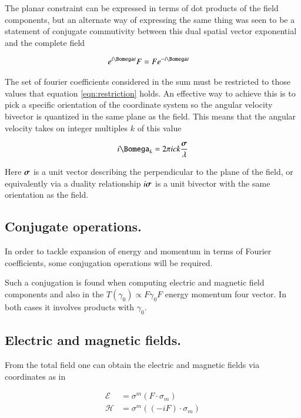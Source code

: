 \documentclass{article}
\newcommand{\EE}[0]{\boldsymbol{\mathcal{E}}}
\newcommand{\HH}[0]{\boldsymbol{\mathcal{H}}}
\begin{document}
The planar constraint can be expressed in terms of dot products of the field components, but an alternate way of expressing the same thing was seen to be
a statement of conjugate commutivity between this dual spatial vector exponential and the complete field

\begin{align}\label{eqn:restriction}
e^{ i \Bomega t} F &= F e^{ -i \Bomega t} 
\end{align}

The set of fourier coefficients considered in the sum must be restricted to those values that equation \ref{eqn:restriction} holds.  An effective 
way to achieve this is to 
pick a specific orientation of the coordinate system so the angular
velocity bivector is quantized in the same plane as the field.  This means that
the angular velocity takes on integer multiples $k$ of this value

\begin{align}
i \Bomega_k = 2 \pi i c k \frac{\Bsigma}{\lambda}
\end{align}

Here $\boldsymbol{\sigma}$ is a unit vector describing the perpendicular to the plane of the field, or equivalently via a duality relationship $i \boldsymbol{\sigma}$ is a unit bivector with the same orientation as the field.

\subsection{ Conjugate operations. }

In order to tackle expansion of energy and momentum in terms of Fourier coefficients, some conjugation operations will be required.

Such a conjugation is found when computing electric and magnetic field components and also in the $T(\gamma_0) \propto F \gamma_0 F$ energy 
momentum four vector.  In both cases it involves products with $\gamma_0$.

\subsection{ Electric and magnetic fields. }

From the total field one can 
obtain the electric and magnetic fields via coordinates as in

%
\begin{align*}
\EE &= \sigma^m (F \cdot \sigma_m) \\
\HH &= \sigma^m ((-i F) \cdot \sigma_m)
\end{align*}
\end{document}
